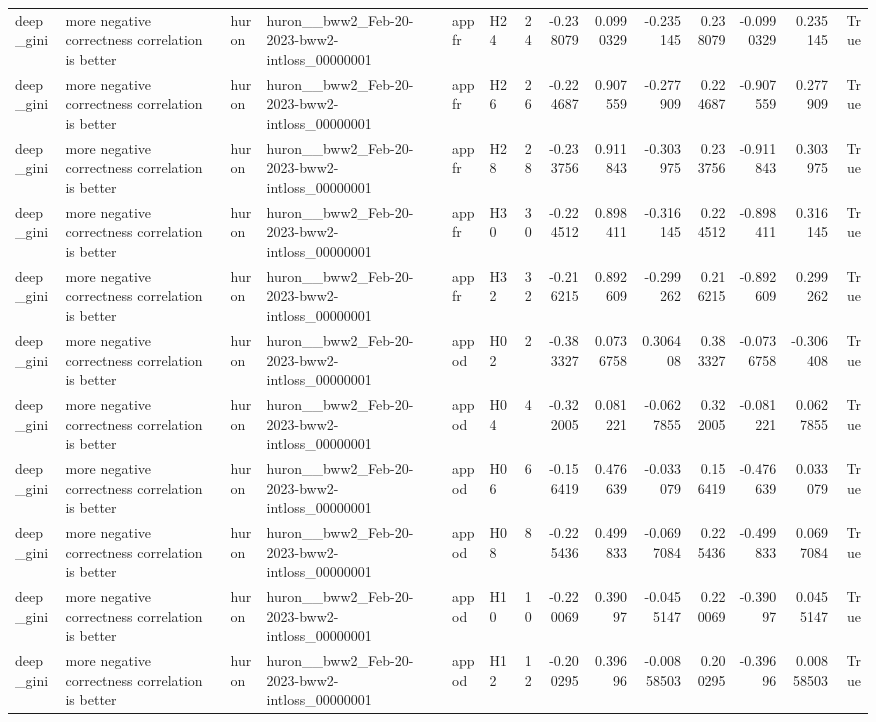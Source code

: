 \begin{longtable}{llllllrrrrrrrr}
deep\_gini & more negative correctness correlation is better & huron & huron\_\_bww2\_Feb-20-2023-bww2-intloss\_00000001 & appfr & H24 & 24 & -0.238079 & 0.0990329 & -0.235145 & 0.238079 & -0.0990329 & 0.235145 & True \\
deep\_gini & more negative correctness correlation is better & huron & huron\_\_bww2\_Feb-20-2023-bww2-intloss\_00000001 & appfr & H26 & 26 & -0.224687 & 0.907559 & -0.277909 & 0.224687 & -0.907559 & 0.277909 & True \\
deep\_gini & more negative correctness correlation is better & huron & huron\_\_bww2\_Feb-20-2023-bww2-intloss\_00000001 & appfr & H28 & 28 & -0.233756 & 0.911843 & -0.303975 & 0.233756 & -0.911843 & 0.303975 & True \\
deep\_gini & more negative correctness correlation is better & huron & huron\_\_bww2\_Feb-20-2023-bww2-intloss\_00000001 & appfr & H30 & 30 & -0.224512 & 0.898411 & -0.316145 & 0.224512 & -0.898411 & 0.316145 & True \\
deep\_gini & more negative correctness correlation is better & huron & huron\_\_bww2\_Feb-20-2023-bww2-intloss\_00000001 & appfr & H32 & 32 & -0.216215 & 0.892609 & -0.299262 & 0.216215 & -0.892609 & 0.299262 & True \\
deep\_gini & more negative correctness correlation is better & huron & huron\_\_bww2\_Feb-20-2023-bww2-intloss\_00000001 & appod & H02 & 2 & -0.383327 & 0.0736758 & 0.306408 & 0.383327 & -0.0736758 & -0.306408 & True \\
deep\_gini & more negative correctness correlation is better & huron & huron\_\_bww2\_Feb-20-2023-bww2-intloss\_00000001 & appod & H04 & 4 & -0.322005 & 0.081221 & -0.0627855 & 0.322005 & -0.081221 & 0.0627855 & True \\
deep\_gini & more negative correctness correlation is better & huron & huron\_\_bww2\_Feb-20-2023-bww2-intloss\_00000001 & appod & H06 & 6 & -0.156419 & 0.476639 & -0.033079 & 0.156419 & -0.476639 & 0.033079 & True \\
deep\_gini & more negative correctness correlation is better & huron & huron\_\_bww2\_Feb-20-2023-bww2-intloss\_00000001 & appod & H08 & 8 & -0.225436 & 0.499833 & -0.0697084 & 0.225436 & -0.499833 & 0.0697084 & True \\
deep\_gini & more negative correctness correlation is better & huron & huron\_\_bww2\_Feb-20-2023-bww2-intloss\_00000001 & appod & H10 & 10 & -0.220069 & 0.39097 & -0.0455147 & 0.220069 & -0.39097 & 0.0455147 & True \\
deep\_gini & more negative correctness correlation is better & huron & huron\_\_bww2\_Feb-20-2023-bww2-intloss\_00000001 & appod & H12 & 12 & -0.200295 & 0.39696 & -0.00858503 & 0.200295 & -0.39696 & 0.00858503 & True \\

\end{longtable}
